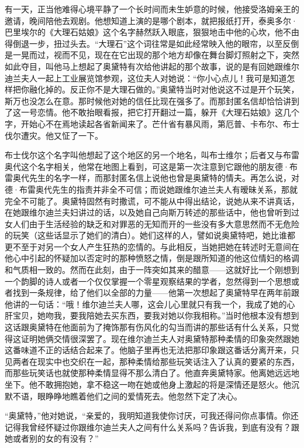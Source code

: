 \par 有一天，正当他难得心境平静了一个长时间而未生妒意的时候，他接受洛姆亲王的邀请，晚间陪他去观剧。他想知道上演的是哪个剧本，就把报纸打开，泰奥多尔·巴里埃尔的《大理石姑娘》这个名字赫然跃入眼底，狠狠地击中他的心坎，他不由得倒退一步，扭过头去。“大理石”这个词往常是如此经常映入他的眼帘，以至反倒是一晃而过，视而不见，现在在它出现的那个地方却像在舞台脚灯照射之下，突然如此夺目，叫他马上想起了奥黛特有次给他讲起的那个故事，说的是有回她跟维尔迪兰夫人一起上工业展览馆参观，这位夫人对她说：“你小心点儿！我可是知道怎样把你融化掉的。反正你不是大理石做的。”奥黛特当时对他说这不过是开个玩笑，斯万也没怎么在意。那时候他对她的信任比现在强多了。而那封匿名信却恰恰讲到了这一号恋情。他不敢抬眼看报，把它打开翻过一篇，躲开《大理石姑娘》这几个字，开始心不在焉地读起各省新闻来了。芒什省有暴风雨，第厄普、卡布尔、布士伐尔遭灾。他又怔了一下。
\par 布士伐尔这个名字叫他想起了这个地区的另一个地名，叫布士维尔；后者又与布雷奥代这个名字相关，他常在地图上看到，可这是第一次注意到它跟他的朋友德·布雷奥代先生的名字一样，而那封匿名信上说他也曾是奥黛特的情夫。再怎么说，对德·布雷奥代先生的指责并非全不可信；而说她跟维尔迪兰夫人有暧昧关系，那就完全不可能了。奥黛特固然有时撒谎，可不能从中得出结论，说她从来不讲真话，在她跟维尔迪兰夫妇讲过的话，以及她自己向斯万转述的那些话中，他也曾听到过女人们由于生活经验的缺乏和对罪恶的无知而开的一些没有多大意思然而不无危险的玩笑（这些话显示了她们的清白）。她们这样的人，譬如说奥黛特吧，她比谁都更不至于对另一个女人产生狂热的恋情的。与此相反，当她把她在转述时无意间在他心中引起的怀疑加以否定时的那种愤怒之情，倒是跟所知道的他这位情妇的格调和气质相一致的。然而在此刻，由于一阵突如其来的醋意——这就好比一个刚想到一个韵脚的诗人或者一个仅仅掌握一个零星观察结果的学者，忽然得到一个思想或者找到一条规律，给了他们以全部的力量——他第一次想起了奥黛特早在两年前跟他讲的一句话：“哦！维尔迪兰夫人哪，这会儿心里就只有我一个，我成了她的心肝宝贝，她吻我，要我陪她去买东西，要我对她以你我相称。”当时他根本没有想到这话跟奥黛特在他面前为了掩饰那有伤风化的勾当而讲的那些话有什么关系，只觉得这证明她俩交情很深罢了。现在维尔迪兰夫人对奥黛特那种柔情的印象突然跟她这番味道不正的话结合起来了。他脑子里再也无法把那印象跟这番话分离开来，只见两者在现实中也交织在一起，那种柔情给那些玩笑话注入了认真的要紧的东西，而那些玩笑话也就使那种柔情显得不那么清白了。他直奔奥黛特家。他离她远远地坐下。他不敢拥抱她，拿不稳这一吻在她或他身上激起的将是深情还是怒火。他沉默不语，眼睁睁地瞧着他们之间的爱情死去。他忽然下定了决心。
\par “奥黛特，”他对她说，“亲爱的，我明知道我使你讨厌，可我还得问你点事情。你还记得我曾经怀疑过你跟维尔迪兰夫人之间有什么关系吗？告诉我，到底有没有？跟她或者别的女的有没有？”
